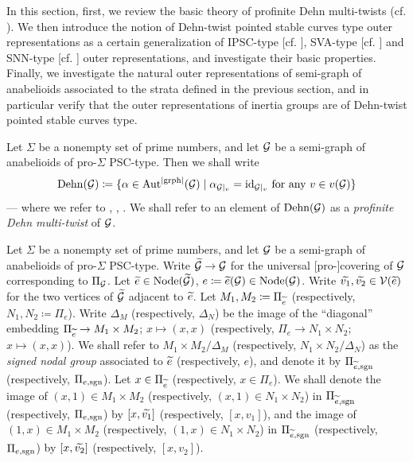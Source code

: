 \indent In this section, first, we review the basic theory of profinite Dehn multi-twists (cf. \cite[\S 4]{CbTpI}). We then introduce the notion of Dehn-twist pointed stable curves type outer representations as a certain generalization of IPSC-type [cf. \cite[Definition 2.4, (i)]{NodNon}], SVA-type [cf. \cite[Definition 2.4, (ii)]{NodNon}] and SNN-type [cf. \cite[Definition 2.4, (iii)]{NodNon}] outer representations, and investigate their basic properties. Finally, we investigate the natural outer representations of semi-graph of anabelioids associated to the strata defined in the previous section, and in particular verify that the outer representations of inertia groups are of Dehn-twist pointed stable curves type.

\begin{defn}
  Let $\Sigma$ be a nonempty set of prime numbers, and let $\mathcal{G}$ be a semi-graph of anabelioids of pro-$\Sigma$ PSC-type. Then we shall write
  \[
    \mathrm{Dehn}(\mathcal{G}) \coloneqq \{ \alpha \in \mathrm{Aut}^{|\text{grph}|}(\mathcal{G}) \mid \alpha_{\mathcal{G}|_v} = \mathrm{id}_{\mathcal{G}|_v} \text{ for any } v \in v(\mathcal{G}) \}
  \]
  --- where we refer to \cite[Definition 2.1, (iii)]{CbTpI}, \cite[Definition 2.14, (ii)]{CbTpI}, \cite[Remark 2.5.1]{CbTpI}. We shall refer to an element of $\mathrm{Dehn}(\mathcal{G})$ as a \emph{profinite Dehn multi-twist} of $\mathcal{G}$.
\end{defn}

\begin{defn}\label{SignedNodalGroup}
  Let $\Sigma$ be a nonempty set of prime numbers, and let $\mathcal{G}$ be a semi-graph of anabelioids of pro-$\Sigma$ PSC-type. Write $\widetilde{\mathcal{G}} \to \mathcal{G}$ for the universal [pro-]covering of $\mathcal{G}$ corresponding to $\Pi_{\mathcal{G}}$. Let $\widetilde{e} \in \mathrm{Node}(\widetilde{\mathcal{G}})$, $e \coloneqq \widetilde{e}(\mathcal{G}) \in \mathrm{Node}(\mathcal{G})$. Write $\widetilde{v_1}, \widetilde{v_2} \in \mathcal{V}(\widetilde{e})$ for the two vertices of $\widetilde{\mathcal{G}}$ adjacent to $\widetilde{e}$. Let $M_1, M_2 \coloneqq \Pi_{\widetilde{e}}$ (respectively, $N_1, N_2 \coloneqq \Pi_e$). Write $\Delta_M$ (respectively, $\Delta_N$) be the image of the ``diagonal'' embedding $\Pi_{\widetilde{e}} \to M_1 \times M_2$; $x \mapsto (x, x)$ (respectively, $\Pi_e \to N_1 \times N_2$; $x \mapsto (x, x)$). We shall refer to $M_1 \times M_2 / \Delta_M$ (respectively, $N_1 \times N_2 / \Delta_N$) as the \emph{signed nodal group} associated to $\widetilde{e}$ (respectively, $e$), and denote it by $\Pi_{\widetilde{e}, \mathrm{sgn}}$ (respectively, $\Pi_{e, \mathrm{sgn}}$). Let $x \in \Pi_{\widetilde{e}}$ (respectively, $x \in \Pi_e$). We shall denote the image of $(x, 1) \in M_1 \times M_2$ (respectively, $(x, 1) \in N_1 \times N_2$) in $\Pi_{\widetilde{e}, \mathrm{sgn}}$ (respectively, $\Pi_{e, \mathrm{sgn}}$) by $[x, \widetilde{v_1}]$ (respectively, $[x, v_1]$), and the image of $(1, x) \in M_1 \times M_2$ (respectively, $(1, x) \in N_1 \times N_2$) in $\Pi_{\widetilde{e}, \mathrm{sgn}}$ (respectively, $\Pi_{e, \mathrm{sgn}}$) by $[x, \widetilde{v_2}]$ (respectively, $[x, v_2]$).
\end{defn}

